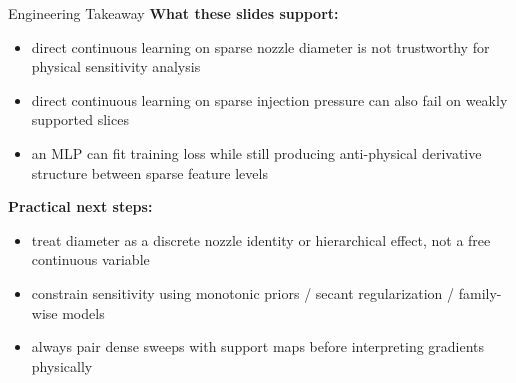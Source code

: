 \documentclass[UTF8,aspectratio=169]{ctexbeamer}
\begin{document}
\begin{frame}{Engineering Takeaway}
\textbf{What these slides support:}
\begin{itemize}
  \item direct continuous learning on sparse nozzle diameter is not trustworthy for physical sensitivity analysis
  \item direct continuous learning on sparse injection pressure can also fail on weakly supported slices
  \item an MLP can fit training loss while still producing anti-physical derivative structure between sparse feature levels
\end{itemize}

\vspace{0.4em}
\textbf{Practical next steps:}
\begin{itemize}
  \item treat diameter as a discrete nozzle identity or hierarchical effect, not a free continuous variable
  \item constrain sensitivity using monotonic priors / secant regularization / family-wise models
  \item always pair dense sweeps with support maps before interpreting gradients physically
\end{itemize}
\end{frame}
\end{document}
